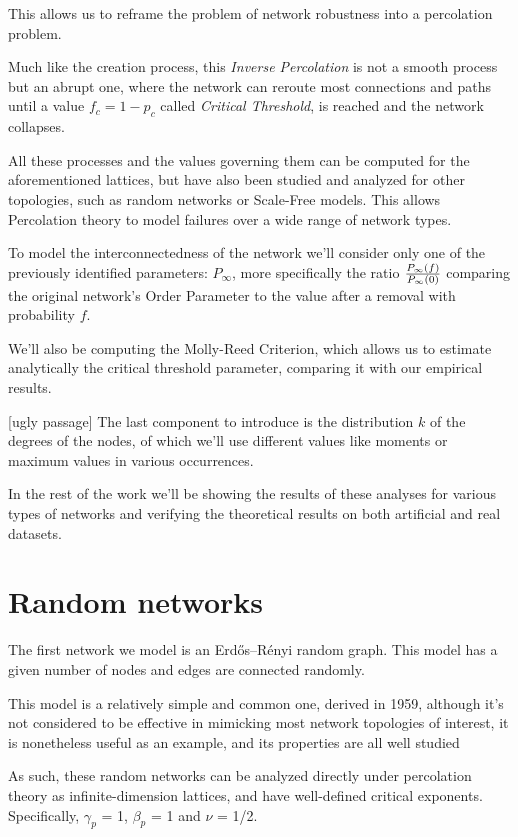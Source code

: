 \documentclass[
]{article}
\begin{document}
This allows us to reframe the problem of network robustness into a
percolation problem.

Much like the creation process, this \emph{Inverse Percolation} is not a
smooth process but an abrupt one, where the network can reroute most
connections and paths until a value \(f_c = 1-p_c\) called
\emph{Critical Threshold}, is reached and the network collapses.

All these processes and the values governing them can be computed for
the aforementioned lattices, but have also been studied and analyzed for
other topologies, such as random networks or Scale-Free models. This
allows Percolation theory to model failures over a wide range of network
types.

To model the interconnectedness of the network we'll consider only one
of the previously identified parameters: \(P_\infty\), more specifically
the ratio \(\Large \frac{P_{\infty}(f)}{P_{\infty}(0)}\) comparing the
original network's Order Parameter to the value after a removal with
probability \(f\).

We'll also be computing the Molly-Reed Criterion, which allows us to
estimate analytically the critical threshold parameter, comparing it
with our empirical results.

{[}ugly passage{]} The last component to introduce is the distribution
\(k\) of the degrees of the nodes, of which we'll use different values
like moments or maximum values in various occurrences.

In the rest of the work we'll be showing the results of these analyses
for various types of networks and verifying the theoretical results on
both artificial and real datasets.

\hypertarget{random-networks}{%
\section{Random networks}\label{random-networks}}

The first network we model is an Erdős--Rényi random graph. This model
has a given number of nodes and edges are connected randomly.

This model is a relatively simple and common one, derived in 1959,
although it's not considered to be effective in mimicking most network
topologies of interest, it is nonetheless useful as an example, and its
properties are all well studied

As such, these random networks can be analyzed directly under
percolation theory as infinite-dimension lattices, and have well-defined
critical exponents. Specifically, \(\gamma_p\) = 1, \(\beta_p\) = 1 and
\(\nu\) = 1/2.
\end{document}
